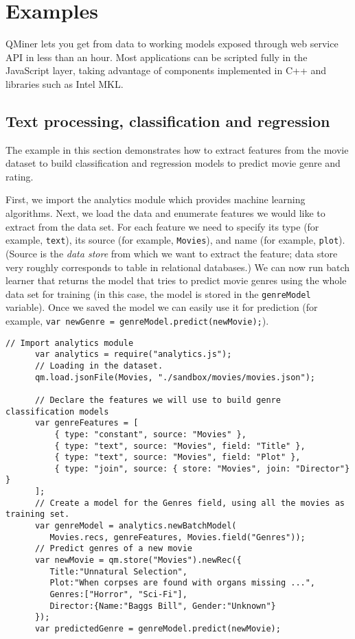 \documentclass{article} %
\begin{document}
\section{Examples}

QMiner lets you get from data to working models exposed through web service API in less than an hour. Most applications can be scripted fully in the JavaScript layer, taking advantage of components implemented in C++ and libraries such as Intel MKL.

\subsection{Text processing, classification and regression}

The example in this section demonstrates how to extract features from the movie dataset to build classification and regression models to predict movie genre and rating.

First, we import the analytics module which provides machine learning algorithms. Next, we load the data and enumerate features we would like to extract from the data set. For each feature we need to specify its type (for example, \texttt{text}), its source (for example, \texttt{Movies}), and name (for example, \texttt{plot}). (Source is the \emph{data store} from which we want to extract the feature; data store very roughly corresponds to table in relational databases.) We can now run batch learner that returns the model that tries to predict movie genres using the whole data set for training (in this case, the model is stored in the \texttt{genreModel} variable). Once we saved the model we can easily use it for prediction (for example, \texttt{var newGenre = genreModel.predict(newMovie);}).

      \begin{lstlisting}[caption={Text mining: storage, feature extraction, classification and regression}] 	
      // Import analytics module
      var analytics = require("analytics.js");
      // Loading in the dataset.
      qm.load.jsonFile(Movies, "./sandbox/movies/movies.json");
       	
      // Declare the features we will use to build genre classification models
      var genreFeatures = [
          { type: "constant", source: "Movies" },
          { type: "text", source: "Movies", field: "Title" },
          { type: "text", source: "Movies", field: "Plot" },
          { type: "join", source: { store: "Movies", join: "Director"} }
      ];
      // Create a model for the Genres field, using all the movies as training set.
      var genreModel = analytics.newBatchModel(
         Movies.recs, genreFeatures, Movies.field("Genres"));
      // Predict genres of a new movie
      var newMovie = qm.store("Movies").newRec({
         Title:"Unnatural Selection",
         Plot:"When corpses are found with organs missing ...",        
         Genres:["Horror", "Sci-Fi"],
         Director:{Name:"Baggs Bill", Gender:"Unknown"}
      });
      var predictedGenre = genreModel.predict(newMovie);
      \end{lstlisting}
\end{document}
